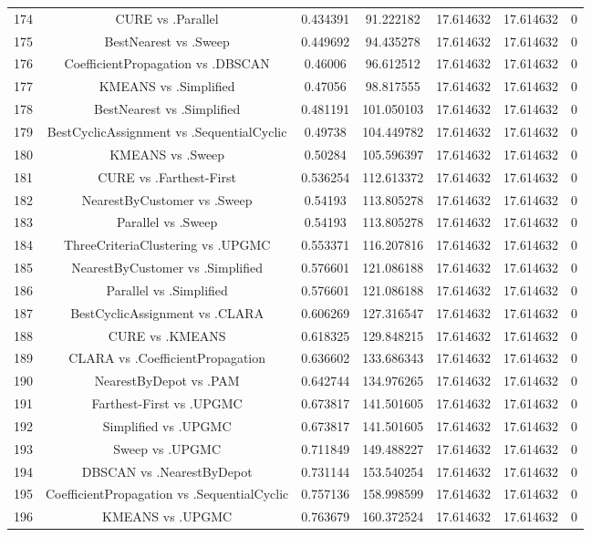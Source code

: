 \documentclass[a4paper,10pt]{article}
\begin{document}
\begin{landscape}
\begin{table}[!htp]
\begin{tabular}{ccccccc}
174&CURE vs .Parallel&0.434391&91.222182&17.614632&17.614632&0\\
175&BestNearest vs .Sweep&0.449692&94.435278&17.614632&17.614632&0\\
176&CoefficientPropagation vs .DBSCAN&0.46006&96.612512&17.614632&17.614632&0\\
177&KMEANS vs .Simplified&0.47056&98.817555&17.614632&17.614632&0\\
178&BestNearest vs .Simplified&0.481191&101.050103&17.614632&17.614632&0\\
179&BestCyclicAssignment vs .SequentialCyclic&0.49738&104.449782&17.614632&17.614632&0\\
180&KMEANS vs .Sweep&0.50284&105.596397&17.614632&17.614632&0\\
181&CURE vs .Farthest-First&0.536254&112.613372&17.614632&17.614632&0\\
182&NearestByCustomer vs .Sweep&0.54193&113.805278&17.614632&17.614632&0\\
183&Parallel vs .Sweep&0.54193&113.805278&17.614632&17.614632&0\\
184&ThreeCriteriaClustering vs .UPGMC&0.553371&116.207816&17.614632&17.614632&0\\
185&NearestByCustomer vs .Simplified&0.576601&121.086188&17.614632&17.614632&0\\
186&Parallel vs .Simplified&0.576601&121.086188&17.614632&17.614632&0\\
187&BestCyclicAssignment vs .CLARA&0.606269&127.316547&17.614632&17.614632&0\\
188&CURE vs .KMEANS&0.618325&129.848215&17.614632&17.614632&0\\
189&CLARA vs .CoefficientPropagation&0.636602&133.686343&17.614632&17.614632&0\\
190&NearestByDepot vs .PAM&0.642744&134.976265&17.614632&17.614632&0\\
191&Farthest-First vs .UPGMC&0.673817&141.501605&17.614632&17.614632&0\\
192&Simplified vs .UPGMC&0.673817&141.501605&17.614632&17.614632&0\\
193&Sweep vs .UPGMC&0.711849&149.488227&17.614632&17.614632&0\\
194&DBSCAN vs .NearestByDepot&0.731144&153.540254&17.614632&17.614632&0\\
195&CoefficientPropagation vs .SequentialCyclic&0.757136&158.998599&17.614632&17.614632&0\\
196&KMEANS vs .UPGMC&0.763679&160.372524&17.614632&17.614632&0\\

\end{tabular}
\end{table}
\end{landscape}
\end{document}
